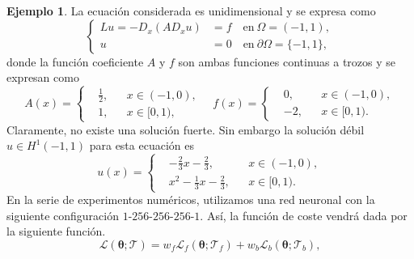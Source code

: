 \documentclass[a4paper,11pt,spanish, twoside, leqno]{tfg-uam}
\theoremstyle{definition}
\newtheorem{exmp}[teor]{Ejemplo}
\begin{document}
\begin{mdframed}
    \begin{exmp}
        La ecuación considerada es unidimensional y se expresa como
        \begin{equation}
            \left\{
            \begin{aligned}
                L u =-D_{x}(AD_{x} u) &=f\quad \text{en}\  \Omega=(-1,1), \\
                u &=0\quad \text{en}\  \partial\Omega=\{-1,1\},
            \end{aligned}
            \right.
        \end{equation}
        donde la función coeficiente $A$ y $f$ son ambas funciones continuas a trozos y se expresan como
        \begin{equation}\label{eq:1dCoeff}
            A(x)=\left\{
            \begin{aligned}
                & \tfrac{1}{2}, & & x\in (-1,0), \\
                &1, & & x\in [0,1),
            \end{aligned}
            \right.\quad 
            f(x)=\left\{
            \begin{aligned}
                & 0, & & x\in (-1,0), \\
                & -2, & & x\in [0,1).
            \end{aligned}
            \right.
        \end{equation}
        Claramente, no existe una solución fuerte. Sin embargo la solución débil $u\in H^1(-1,1)$ para esta ecuación es
        \begin{equation}\label{eq:SolTo1dEq}
            u(x)=
            \left\{
            \begin{aligned}
                & -\tfrac{2}{3}x-\tfrac{2}{3}, & & x\in (-1,0), \\
                & x^2-\tfrac{1}{3}x-\tfrac{2}{3}, & & x\in [0,1).
            \end{aligned}
            \right.
        \end{equation}
        En la serie de experimentos numéricos, utilizamos una red neuronal con la siguiente configuración $1$-$256$-$256$-$256$-$1$.  Así, la función de coste vendrá dada por la siguiente función.
        \begin{equation*} 
            \mathcal{L}(\boldsymbol{\theta}; \mathcal{T}) = w_f \mathcal{L}_f(\boldsymbol{\theta}; \mathcal{T}_f) + w_b \mathcal{L}_b(\boldsymbol{\theta}; \mathcal{T}_b),
        \end{equation*}

\end{exmp}
\end{mdframed}
\end{document}
